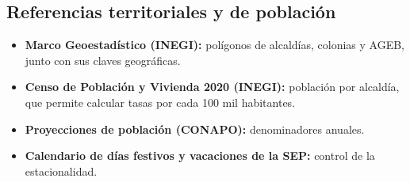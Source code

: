 \subsection{Referencias territoriales y de población}
\begin{itemize}
  \item \textbf{Marco Geoestadístico (INEGI):} polígonos de alcaldías, colonias y AGEB, junto con sus claves geográficas.
  \item \textbf{Censo de Población y Vivienda 2020 (INEGI):} población por alcaldía, que permite calcular tasas por cada 100 mil habitantes.
  \item \textbf{Proyecciones de población (CONAPO):} denominadores anuales.
  \item \textbf{Calendario de días festivos y vacaciones de la SEP:} control de la estacionalidad.
\end{itemize}
